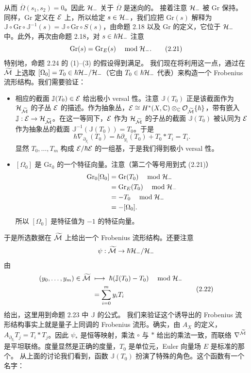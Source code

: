 \begin{example}
\[\]
从而 $\overline{\Omega}(s_1,s_2)=0$。因此 $\mathcal{H}_-$ 关于 $\overline{\Omega}$ 是迷向的。
接着注意 $\mathcal{H}_-$ 被 $\mathrm{Gr}$ 保持。同样，$\mathrm{Gr}$ 定义在 $\mathcal{E}$ 上，所以给定 $s\in\mathcal{H}_-$，我们应把 $\mathrm{Gr}(s)$ 解释为 $\mathbb{J}\circ\mathrm{Gr}\circ\mathbb{J}^{-1}(s)=\mathbb{J}\circ\mathrm{Gr}\circ S(s)$，由命题 2.18 以及 $\mathrm{Gr}$ 的定义，它位于 $\mathcal{H}_-$ 中。此外，再次由命题 2.18，对 $s\in\hbar\mathcal{H}_-$ 注意
\begin{equation}
\mathrm{Gr}(s)=\mathrm{Gr}_E(s)\quad\bmod\mathcal{H}_-. \tag{2.21}
\end{equation}
特别地，命题 2.24 的 (1)–(3) 的假设得到满足。
我们现在将利用这一点，通过在 $\widetilde{\mathcal{M}}$ 上选取 $[\Omega_0]=T_0\in\hbar\mathcal{H}_-/\mathcal{H}_-$（它由 $T_0\in\hbar\mathcal{H}_-$ 代表）来构造一个 Frobenius 流形结构。我们需要验证：

\begin{itemize}[leftmargin=2em]
\item 相应的截面 $\mathbb{J}(T_0)\in\mathcal{E}$ 给出极小 versal 性。注意 $\mathbb{J}(T_0)$ 正是该截面作为 $\mathcal{H}_{\widetilde{\mathcal{M}}}$ 的子丛 $\mathcal{E}$ 的描述。作为抽象丛，$\mathcal{E}\cong H^*(X,\mathbb{C})\otimes_{\mathbb{C}}\mathcal{O}_{\widetilde{\mathcal{M}}}\{\hbar\}$，带有嵌入 $\mathbb{J}:\mathcal{E}\to\mathcal{H}_{\widetilde{\mathcal{M}}}$。在这一等同下，$\mathcal{E}$ 作为 $\mathcal{H}_{\widetilde{\mathcal{M}}}$ 的子丛的截面 $\mathbb{J}(T_0)$ 被认同为 $\mathcal{E}$ 作为抽象丛的截面 $\mathbb{J}^{-1}(\mathbb{J}(T_0))=T_0$。于是
\[
\hbar\nabla_{\partial_{y_i}}(T_0)=\hbar\partial_{y_i}(T_0)+T_0*T_i=T_i.
\]
显然 $T_0,\dots,T_m$ 构成 $\mathcal{E}/\hbar\mathcal{E}$ 的一组基，于是我们得到极小 versal 性。
\item $[\Omega_0]$ 是 $\mathrm{Gr}_0$ 的一个特征向量。注意（第二个等号用到式 (2.21)）
\begin{align*}
\mathrm{Gr}_0[\Omega_0]&=\mathrm{Gr}(T_0)\quad\bmod\mathcal{H}_-\\
&=\mathrm{Gr}_E(T_0)\quad\bmod\mathcal{H}_-\\
&=-T_0\quad\bmod\mathcal{H}_-\\
&=-[\Omega_0].
\end{align*}
所以 $[\Omega_0]$ 是特征值为 $-1$ 的特征向量。
\end{itemize}
于是所选数据在 $\widetilde{\mathcal{M}}$ 上给出一个 Frobenius 流形结构。还要注意
\[
\psi:\widetilde{\mathcal{M}}\to\hbar\mathcal{H}_-/\mathcal{H}_-
\]
由
\begin{equation}
\begin{aligned}
(y_0,\dots,y_m)\in\widetilde{\mathcal{M}}\;&\longmapsto\;\hbar(\mathbb{J}(T_0)-T_0)\quad\bmod\mathcal{H}_-\\
&=\sum_{i=0}^{m}y_iT_i
\end{aligned}
\tag{2.22}
\end{equation}
给出，这里用到命题 2.23 中 $\mathbb{J}$ 的公式。
我们来验证这个诱导出的 Frobenius 流形结构事实上就是量子上同调的 Frobenius 流形。确实，由 $A_X$ 的定义，$A_{\partial_{y_i}}T_j=T_i*T_j$。因此 $\psi_*$ 是恒等映射，乘法 $\circ$ 与 $*$ 给出的乘法一致，而联络 $\nabla^{\widetilde{\mathcal{M}}}$ 是平坦联络。度量显然是正确的度量，$T_0$ 是单位元，Euler 向量场 $E$ 是标准的那个。
从上面的讨论我们看到，函数 $\mathbb{J}(T_0)$ 扮演了特殊的角色。这个函数有一个名字：
\end{example}

